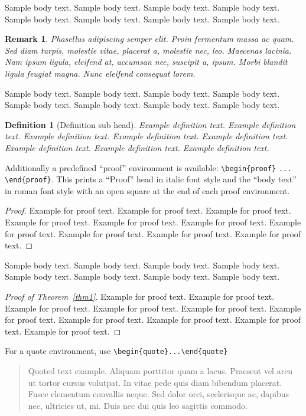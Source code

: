 \documentclass[pdflatex,sn-mathphys-ay]{sn-jnl}%
\theoremstyle{thmstyleone}%
\theoremstyle{thmstyletwo}%
\newtheorem{remark}{Remark}%
\theoremstyle{thmstylethree}%
\newtheorem{definition}{Definition}%
\begin{document}
Sample body text. Sample body text. Sample body text. Sample body text. Sample body text. Sample body text. Sample body text. Sample body text.

\begin{remark}
Phasellus adipiscing semper elit. Proin fermentum massa
ac quam. Sed diam turpis, molestie vitae, placerat a, molestie nec, leo. Maecenas lacinia. Nam ipsum ligula, eleifend
at, accumsan nec, suscipit a, ipsum. Morbi blandit ligula feugiat magna. Nunc eleifend consequat lorem. 
\end{remark}

Sample body text. Sample body text. Sample body text. Sample body text. Sample body text. Sample body text. Sample body text. Sample body text.

\begin{definition}[Definition sub head]
Example definition text. Example definition text. Example definition text. Example definition text. Example definition text. Example definition text. Example definition text. Example definition text. 
\end{definition}

Additionally a predefined ``proof'' environment is available: \verb+\begin{proof}+ \verb+...+ \verb+\end{proof}+. This prints a ``Proof'' head in italic font style and the ``body text'' in roman font style with an open square at the end of each proof environment. 

\begin{proof}
Example for proof text. Example for proof text. Example for proof text. Example for proof text. Example for proof text. Example for proof text. Example for proof text. Example for proof text. Example for proof text. Example for proof text. 
\end{proof}

Sample body text. Sample body text. Sample body text. Sample body text. Sample body text. Sample body text. Sample body text. Sample body text.

\begin{proof}[Proof of Theorem~{\upshape\ref{thm1}}]
Example for proof text. Example for proof text. Example for proof text. Example for proof text. Example for proof text. Example for proof text. Example for proof text. Example for proof text. Example for proof text. Example for proof text. 
\end{proof}

\noindent
For a quote environment, use \verb+\begin{quote}...\end{quote}+
\begin{quote}
Quoted text example. Aliquam porttitor quam a lacus. Praesent vel arcu ut tortor cursus volutpat. In vitae pede quis diam bibendum placerat. Fusce elementum
convallis neque. Sed dolor orci, scelerisque ac, dapibus nec, ultricies ut, mi. Duis nec dui quis leo sagittis commodo.
\end{quote}
\end{document}

